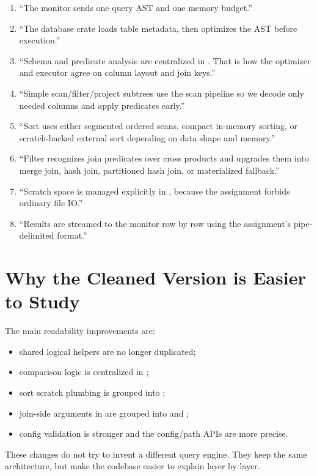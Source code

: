 \documentclass[11pt]{article}
\begin{document}
\begin{enumerate}[leftmargin=*]
    \item ``The monitor sends one query AST and one memory budget.''
    \item ``The database crate loads table metadata, then optimizes the AST before execution.''
    \item ``Schema and predicate analysis are centralized in . That is how the optimizer and executor agree on column layout and join keys.''
    \item ``Simple scan/filter/project subtrees use the scan pipeline so we decode only needed columns and apply predicates early.''
    \item ``Sort uses either segmented ordered scans, compact in-memory sorting, or scratch-backed external sort depending on data shape and memory.'' 
    \item ``Filter recognizes join predicates over cross products and upgrades them into merge join, hash join, partitioned hash join, or materialized fallback.''
    \item ``Scratch space is managed explicitly in , because the assignment forbids ordinary file IO.'' 
    \item ``Results are streamed to the monitor row by row using the assignment's pipe-delimited format.''
\end{enumerate}

\section{Why the Cleaned Version is Easier to Study}
The main readability improvements are:

\begin{itemize}[leftmargin=*]
    \item shared logical helpers are no longer duplicated;
    \item comparison logic is centralized in ;
    \item sort scratch plumbing is grouped into ;
    \item join-side arguments in  are grouped into  and ;
    \item config validation is stronger and the config/path APIs are more precise.
\end{itemize}

These changes do not try to invent a different query engine. They keep the same architecture, but make the codebase easier to explain layer by layer.
\end{document}
